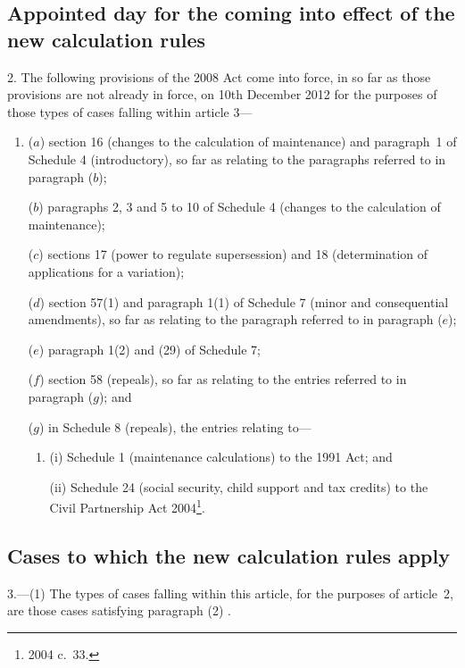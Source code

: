 \documentclass[12pt,a4paper]{article}
\begin{document}
\subsection[2. Appointed day for the coming into effect of the new calculation rules]{Appointed day for the coming into effect of the new calculation rules}

2.  The following provisions of the 2008 Act come into force, in so far as those provisions are not already in force, on 10th December 2012 for the purposes of those types of cases falling within article 3—
\begin{enumerate}\item[]
($a$) section 16 (changes to the calculation of maintenance) and paragraph~1 of Schedule 4 (introductory), so far as relating to the paragraphs referred to in paragraph ($b$);

($b$) paragraphs 2, 3 and 5 to 10 of Schedule 4 (changes to the calculation of maintenance);

($c$) sections 17 (power to regulate supersession) and 18 (determination of applications for a variation);

($d$) section 57(1) and paragraph 1(1) of Schedule 7 (minor and consequential amendments), so far as relating to the paragraph referred to in paragraph ($e$);

($e$) paragraph 1(2) and (29) of Schedule 7;

($f$) section 58 (repeals), so far as relating to the entries referred to in paragraph ($g$); and

($g$) in Schedule 8 (repeals), the entries relating to—
\begin{enumerate}\item[]
(i) Schedule 1 (maintenance calculations) to the 1991 Act; and

(ii) Schedule 24 (social security, child support and tax credits) to the Civil Partnership Act 2004\footnote{2004 c.~33.}.
\end{enumerate}
\end{enumerate}

\subsection[3. Cases to which the new calculation rules apply]{Cases to which the new calculation rules apply}

3.---(1)  The types of cases falling within this article, for the purposes of article~2, are those cases satisfying 
paragraph (2)%
.
\end{document}
